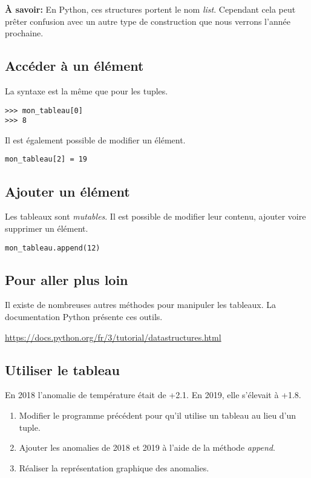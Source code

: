 \documentclass[a4paper,11pt]{article}
\begin{document}
\begin{Form}
\textbf{À savoir:} En Python, ces structures portent le nom \emph{list}. Cependant cela peut prêter confusion avec un autre type de construction que nous verrons l'année prochaine.
\subsection{Accéder à un élément}
La syntaxe est la même que pour les tuples.
\begin{code}[!h]
\begin{lstlisting}
>>> mon_tableau[0]
>>> 8
\end{lstlisting}
\label{accestab}
\end{code}

Il est également possible de modifier un élément.
\begin{center}
\begin{lstlisting}
mon_tableau[2] = 19
\end{lstlisting}
\label{modif}
\end{center}
\subsection{Ajouter un élément}
Les tableaux sont \emph{mutables}. Il est possible de modifier leur contenu, ajouter voire supprimer un élément.
\begin{code}[!h]
\begin{lstlisting}
mon_tableau.append(12)
\end{lstlisting}
\label{ajout}
\end{code}
\subsection{Pour aller plus loin}
Il existe de nombreuses autres méthodes pour manipuler les tableaux. La documentation Python présente ces outils.
\begin{center}
\url{https://docs.python.org/fr/3/tutorial/datastructures.html}
\end{center}
\subsection{Utiliser le tableau}
En 2018 l'anomalie de température était de +2.1. En 2019, elle s'élevait à +1.8.
\begin{activite}
\begin{enumerate}
\item Modifier le programme précédent pour qu'il utilise un tableau au lieu d'un tuple.
\item Ajouter les anomalies de 2018 et 2019 à l'aide de la méthode \emph{append}.
\item Réaliser la représentation graphique des anomalies.
\end{enumerate}
\end{activite}
\end{Form}
\end{document}

